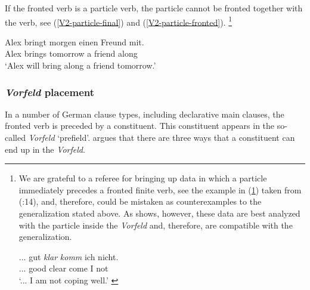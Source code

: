 \documentclass[output=paper]{langsci/langscibook}
\begin{document}
\begin{exe}
\end{exe}

If the fronted verb is a particle verb, the particle cannot be fronted together with the verb, 
see (\ref{V2-particle-final}) and (\ref{V2-particle-fronted}).%
\footnote{We are grateful to a referee for bringing up data in which a particle immediately precedes a fronted finite verb, see the example in (\ref{gut klar}) taken from \citeauthor{Mueller:05} (\citeyear{Mueller:05}:14), and, therefore, could be mistaken as counterexamples to the generalization stated above. As \cite{Mueller:05} shows, however, these data are best analyzed with the particle inside the \textit{Vorfeld} and, therefore, are compatible with the generalization.

\ea
\gll ... gut \textit{klar} \textit{komm} ich nicht. \\
... good clear come I not \\
\glt `... I am not coping well.' \label{gut klar}
\z
}

\ea
\ea\label{V2-particle}
\gll Alex bringt morgen einen Freund mit. \\
Alex brings tomorrow a friend along \\
\glt `Alex will bring along a friend tomorrow.' \label{V2-particle-final}
\label{V2-particle-fronted}
\z
\z



\subsubsection{\textit{Vorfeld} placement}\label{sec-VorfeldPlacement}

In a number of  German clause types, including declarative main clauses, the fronted verb is preceded by a constituent. This constituent appears in the so-called \textit{Vorfeld} `prefield'. \cite{Frey06-Contrast} argues that there are three ways that a constituent can end up in the \textit{Vorfeld}.
\end{document}

